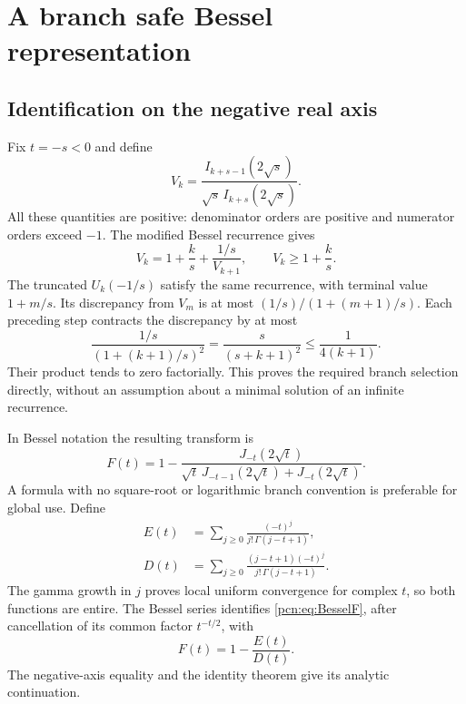 \documentclass[11pt,letterpaper]{article}
\theoremstyle{remark}\newtheorem{remark}[theorem]{Remark}
\begin{document}
\section{A branch safe Bessel representation}\label{pcn:sec:bessel}
\subsection{Identification on the negative real axis}
Fix $t=-s<0$ and define
\[
 V_k=\frac{I_{k+s-1}(2\sqrt{s})}{\sqrt{s}\,I_{k+s}(2\sqrt{s})}.
\]
All these quantities are positive: denominator orders are positive and numerator orders exceed $-1$. The modified Bessel recurrence gives
\begin{equation}\label{pcn:eq:Irec}
 V_k=1+\frac{k}{s}+\frac{1/s}{V_{k+1}},\qquad V_k\ge1+\frac{k}{s}.
\end{equation}
The truncated $U_k(-1/s)$ satisfy the same recurrence, with terminal value $1+m/s$. Its discrepancy from $V_m$ is at most $(1/s)/(1+(m+1)/s)$. Each preceding step contracts the discrepancy by at most
\[
 \frac{1/s}{(1+(k+1)/s)^2}=\frac{s}{(s+k+1)^2}\le\frac1{4(k+1)}.
\]
Their product tends to zero factorially. This proves the required branch selection directly, without an assumption about a minimal solution of an infinite recurrence.

In Bessel notation the resulting transform is
\begin{equation}\label{pcn:eq:BesselF}
 F(t)=1-\frac{J_{-t}(2\sqrt t)}{\sqrt t\,J_{-t-1}(2\sqrt t)+J_{-t}(2\sqrt t)}.
\end{equation}
A formula with no square-root or logarithmic branch convention is preferable for global use. Define
\begin{align}
 E(t)&=\sum_{j\ge0}\frac{(-t)^j}{j!\,\Gamma(j-t+1)},\label{pcn:eq:E}\\
 D(t)&=\sum_{j\ge0}\frac{(j-t+1)(-t)^j}{j!\,\Gamma(j-t+1)}.\label{pcn:eq:D}
\end{align}
The gamma growth in $j$ proves local uniform convergence for complex $t$, so both functions are entire. The Bessel series \cite[\S10.2]{DLMF} identifies \eqref{pcn:eq:BesselF}, after cancellation of its common factor $t^{-t/2}$, with
\begin{equation}\label{pcn:eq:entirequotient}
 F(t)=1-\frac{E(t)}{D(t)}.
\end{equation}
The negative-axis equality and the identity theorem give its analytic continuation.
\end{document}
